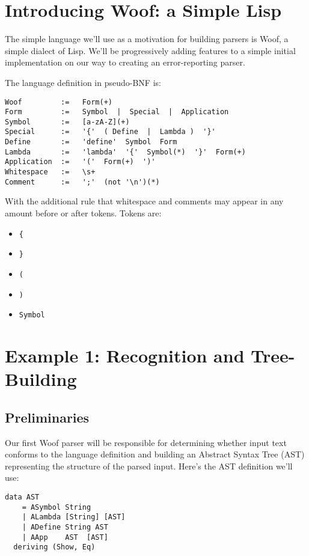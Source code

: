 \documentclass{tmr}
\begin{document}
\section{Introducing Woof:  a Simple Lisp}

The simple language we'll use as a motivation for building parsers is Woof, a 
simple dialect of Lisp.  We'll be progressively adding features to a simple 
initial implementation on our way to creating an error-reporting parser.

The language definition in pseudo-BNF \cite{bnf} is:

\begin{verbatim}
Woof         :=   Form(+)
Form         :=   Symbol  |  Special  |  Application
Symbol       :=   [a-zA-Z](+)
Special      :=   '{'  ( Define  |  Lambda )  '}'
Define       :=   'define'  Symbol  Form
Lambda       :=   'lambda'  '{'  Symbol(*)  '}'  Form(+)
Application  :=   '('  Form(+)  ')'
Whitespace   :=   \s+
Comment      :=   ';'  (not '\n')(*)
\end{verbatim}

With the additional rule that whitespace and comments may appear in any 
amount before or after tokens.  Tokens are:
\begin{itemize}
  \item \verb+{+
  \item \verb+}+
  \item \verb+(+
  \item \verb+)+
  \item \verb+Symbol+
\end{itemize}




\section{Example 1: Recognition and Tree-Building}

\subsection{Preliminaries}
Our first Woof parser will be responsible for determining whether input
text conforms to the language definition and building an 
Abstract Syntax Tree (AST) representing the structure of the parsed input.
Here's the AST definition we'll use:
\begin{verbatim}
data AST
    = ASymbol String
    | ALambda [String] [AST]
    | ADefine String AST
    | AApp    AST  [AST]
  deriving (Show, Eq)
\end{verbatim}
\end{document}
